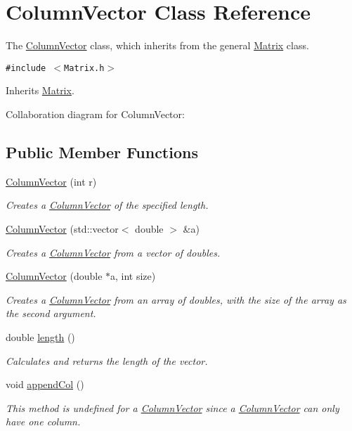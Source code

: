 \hypertarget{class_column_vector}{
\section{ColumnVector Class Reference}
\label{class_column_vector}
}
The \hyperlink{class_column_vector}{ColumnVector} class, which inherits from the general \hyperlink{class_matrix}{Matrix} class.  


{\tt \#include $<$Matrix.h$>$}

Inherits \hyperlink{class_matrix}{Matrix}.

Collaboration diagram for ColumnVector:\subsection*{Public Member Functions}
\begin{CompactItemize}
\item 
\hyperlink{class_column_vector_080508988b684290b2a0123a923a1e08}{ColumnVector} (int r)
\begin{CompactList}\small\item\em Creates a \hyperlink{class_column_vector}{ColumnVector} of the specified length. \item\end{CompactList}\item 
\hyperlink{class_column_vector_51a68a454f01918fd4bc1736ac0d4264}{ColumnVector} (std::vector$<$ double $>$ \&a)
\begin{CompactList}\small\item\em Creates a \hyperlink{class_column_vector}{ColumnVector} from a vector of doubles. \item\end{CompactList}\item 
\hyperlink{class_column_vector_a0b9560305d34dd819e7913a811f3336}{ColumnVector} (double $\ast$a, int size)
\begin{CompactList}\small\item\em Creates a \hyperlink{class_column_vector}{ColumnVector} from an array of doubles, with the size of the array as the second argument. \item\end{CompactList}\item 
double \hyperlink{class_column_vector_66329a870ee70b5cd93879d3be247b21}{length} ()
\begin{CompactList}\small\item\em Calculates and returns the length of the vector. \item\end{CompactList}\item 
void \hyperlink{class_column_vector_0e67b7831d9d4c02691056a72abc6975}{appendCol} ()
\begin{CompactList}\small\item\em This method is undefined for a \hyperlink{class_column_vector}{ColumnVector} since a \hyperlink{class_column_vector}{ColumnVector} can only have one column. \item\end{CompactList}\end{CompactItemize}


